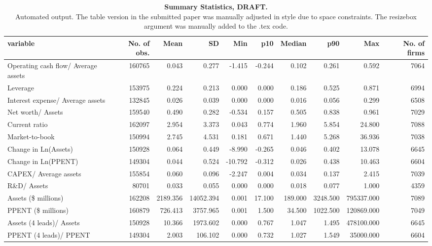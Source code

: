 \begin{table}[ht]
\centering
\caption{\textbf{Summary Statistics, DRAFT.} \\
                     Automated output. The table version in the submitted paper 
                     was manually adjusted in style due to space constraints. The resizebox{} argument 
             was manually added to the .tex code.} 
\begin{tabular}{lrrrrrrrrr}
  \hline
variable & No. of obs. & Mean & SD & Min & p10 & Median & p90 & Max & No. of firms \\ 
  \hline
Operating cash flow/ Average assets & 160765 & 0.043 & 0.277 & -1.415 & -0.244 & 0.102 & 0.261 & 0.592 & 7064 \\ 
  Leverage & 153975 & 0.224 & 0.213 & 0.000 & 0.000 & 0.186 & 0.525 & 0.871 & 6994 \\ 
  Interest expense/ Average assets & 132845 & 0.026 & 0.039 & 0.000 & 0.000 & 0.016 & 0.056 & 0.299 & 6508 \\ 
  Net worth/ Assets & 159540 & 0.490 & 0.282 & -0.534 & 0.157 & 0.505 & 0.838 & 0.961 & 7029 \\ 
  Current ratio & 162097 & 2.954 & 3.373 & 0.043 & 0.774 & 1.960 & 5.854 & 24.800 & 7088 \\ 
  Market-to-book & 150994 & 2.745 & 4.531 & 0.181 & 0.671 & 1.440 & 5.268 & 36.936 & 7038 \\ 
  Change in Ln(Assets) & 150928 & 0.064 & 0.449 & -8.990 & -0.265 & 0.046 & 0.402 & 13.078 & 6645 \\ 
  Change in Ln(PPENT) & 149304 & 0.044 & 0.524 & -10.792 & -0.312 & 0.026 & 0.438 & 10.463 & 6604 \\ 
  CAPEX/ Average assets & 155854 & 0.060 & 0.096 & -2.247 & 0.004 & 0.034 & 0.137 & 2.415 & 7039 \\ 
  R\&D/ Assets & 80701 & 0.033 & 0.055 & 0.000 & 0.000 & 0.018 & 0.077 & 1.000 & 4359 \\ 
  Assets (\$ millions) & 162208 & 2189.356 & 14052.394 & 0.001 & 17.100 & 189.000 & 3248.500 & 795337.000 & 7089 \\ 
  PPENT (\$ millions) & 160879 & 726.413 & 3757.965 & 0.001 & 1.500 & 34.500 & 1022.500 & 120869.000 & 7049 \\ 
  Assets (4 leads)/ Assets & 150928 & 10.366 & 1973.602 & 0.000 & 0.767 & 1.047 & 1.495 & 478100.000 & 6645 \\ 
  PPENT (4 leads)/ PPENT & 149304 & 2.003 & 106.102 & 0.000 & 0.732 & 1.027 & 1.549 & 35000.000 & 6604 \\ 

\end{tabular}
\end{table}
